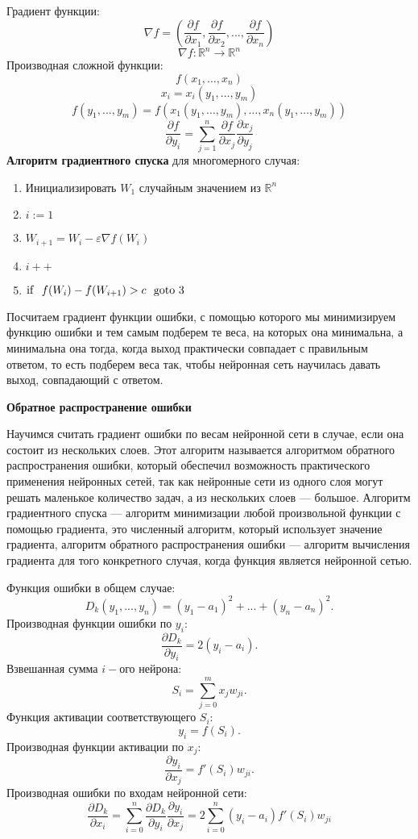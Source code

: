 \documentclass[14pt]{extreport}
\begin{document}
Градиент функции: $$\nabla f = \left(\frac{\partial f}{\partial x_1}, \frac{\partial f}{\partial x_2}, \ldots, \frac{\partial f}{\partial x_n}\right)$$
$$\nabla f:\mathbb{R}^n\rightarrow \mathbb{R}^n$$
Производная сложной функции: $$f(x_1, \ldots, x_n)$$
$$x_i = x_i(y_1, \ldots, y_m)$$
$$f(y_1, \ldots, y_m) = f(x_1(y_1, \ldots, y_m), \ldots, x_n(y_1, \ldots, y_m))$$
$$\frac{\partial f}{\partial y_i} = \sum_{j=1}^{n} \frac{\partial f}{\partial x_j}\frac{\partial x_j}{\partial y_j}$$
\textbf{Алгоритм градиентного спуска} для многомерного случая:
\begin{enumerate}
 \item Инициализировать $W_1$ случайным значением из $\mathbb{R}^n$
 \item $i:=1$
 \item $W_{i+1}=W_i-\varepsilon \nabla f(W_i)$
 \item $i++$
 \item ${\rm if}\ \ f(W_{i})-f(W_{i+1})>c\ \ {\rm goto}\ 3$
 \end{enumerate}

Посчитаем градиент функции ошибки, с помощью которого мы минимизируем функцию ошибки и тем самым подберем те веса, на которых она минимальна, а минимальна она тогда, когда выход практически совпадает с правильным ответом, то есть подберем веса так, чтобы нейронная сеть научилась давать выход, совпадающий с ответом.

\textbf{Обратное распространение ошибки}

Научимся считать градиент ошибки по весам нейронной сети в случае, если она состоит из нескольких слоев. Этот алгоритм называется алгоритмом обратного распространения ошибки, который обеспечил возможность практического применения нейронных сетей, так как нейронные сети из одного слоя могут решать маленькое количество задач, а из нескольких слоев --- большое. Алгоритм градиентного спуска --- алгоритм минимизации любой произвольной функции с помощью градиента, это численный алгоритм, который использует значение градиента, алгоритм обратного распространения ошибки --- алгоритм вычисления градиента для того конкретного случая, когда функция является нейронной сетью.

Функция ошибки в общем случае:
$$D_k(y_1,...,y_n)=(y_1-a_1)^2+...+(y_n-a_n)^2.$$
Производная функции ошибки по $y_i$:
$$\frac{\partial{D_k}}{\partial{y_i}}=2(y_i-a_i).$$
Взвешанная сумма $i-$ого нейрона:
$$S_i=\sum_{j=0}^{m}x_j w_{ji}.$$
Функция активации соответствующего $S_i$:
$$y_i=f(S_i).$$
Производная функции активации по $x_j$:
$$\frac{\partial{y_i}}{\partial{x_j}}={f'(S_i)w_{ji}}.$$
Производная ошибки по входам нейронной сети:
$$\frac{\partial{D_k}}{\partial {x_i}}=\sum_{i=0}^{n}\frac{\partial{D_k}}{\partial {y_i}}\frac{\partial{y_i}}{\partial {x_j}} = 2\sum_{i=0}^{n}(y_i-a_i)f'(S_i)w_{ji}$$
\end{document}
